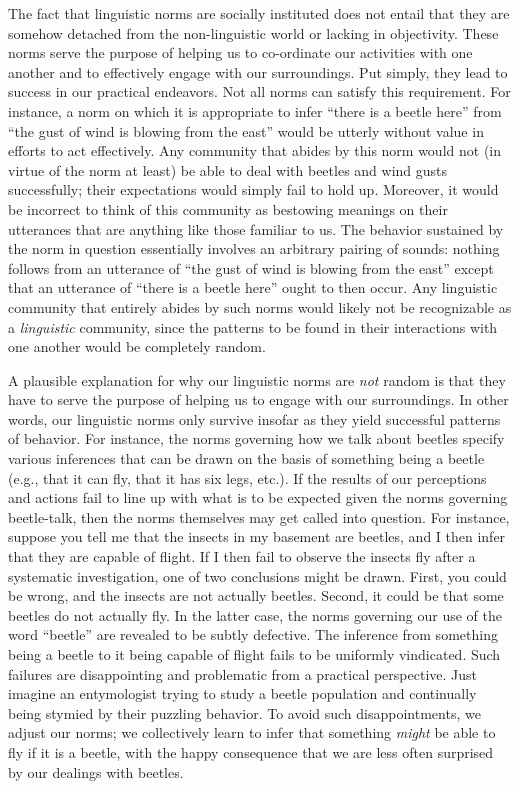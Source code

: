 The fact that linguistic norms are socially instituted does not entail that they are somehow detached from the non-linguistic world or lacking in objectivity. These norms serve the purpose of helping us to co-ordinate our activities with one another and to effectively engage with our surroundings. Put simply, they lead to success in our practical endeavors. Not all norms can satisfy this requirement. For instance, a norm on which it is appropriate to infer ``there is a beetle here'' from ``the gust of wind is blowing from the east'' would be utterly without value in efforts to act effectively. Any community that abides by this norm would not (in virtue of the norm at least) be able to deal with beetles and wind gusts successfully; their expectations would simply fail to hold up. Moreover, it would be incorrect to think of this community as bestowing meanings on their utterances that are anything like those familiar to us. The behavior sustained by the norm in question essentially involves an arbitrary pairing of sounds: nothing follows from an utterance of ``the gust of wind is blowing from the east'' except that an utterance of ``there is a beetle here'' ought to then occur. Any linguistic community that entirely abides by such norms would likely not be recognizable as a \textit{linguistic} community, since the patterns to be found in their interactions with one another would be completely random. 

A plausible explanation for why our linguistic norms are \textit{not} random is that they have to serve the purpose of helping us to engage with our surroundings. In other words, our linguistic norms only survive insofar as they yield successful patterns of behavior. For instance, the norms governing how we talk about beetles specify various inferences that can be drawn on the basis of something being a beetle (e.g., that it can fly, that it has six legs, etc.). If the results of our perceptions and actions fail to line up with what is to be expected given the norms governing beetle-talk, then the norms themselves may get called into question. For instance, suppose you tell me that the insects in my basement are beetles, and I then infer that they are capable of flight. If I then fail to observe the insects fly after a systematic investigation, one of two conclusions might be drawn. First, you could be wrong, and the insects are not actually beetles. Second, it could be that some beetles do not actually fly. In the latter case, the norms governing our use of the word ``beetle'' are revealed to be subtly defective. The inference from something being a beetle to it being capable of flight fails to be uniformly vindicated. Such failures are disappointing and problematic from a practical perspective. Just imagine an entymologist trying to study a beetle population and continually being stymied by their puzzling behavior. To avoid such disappointments, we adjust our norms; we collectively learn to infer that something \textit{might} be able to fly if it is a beetle, with the happy consequence that we are less often surprised by our dealings with beetles.

